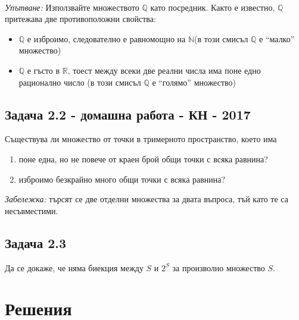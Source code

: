 \documentclass[12pt]{article}
\begin{document}
\paragraph*{}
\emph{Упътване: } Използвайте множеството $\mathbb{Q}$ като посредник. Както е известно, $\mathbb{Q}$ притежава две противоположни свойства:
\begin{itemize}
    \item $\mathbb{Q}$ е изброимо, следователно е равномощно на $\mathbb{N}$(в този смисъл $\mathbb{Q}$ е ``малко'' множество)
    \item $\mathbb{Q}$ е гъсто в $\mathbb{R}$, тоест между всеки две реални числа има поне едно рационално число (в този смисъл $\mathbb{Q}$ е ``голямо'' множество)
\end{itemize}
\subsection*{Задача 2.2 - домашна работа - КН - 2017}
Съществува ли множество от точки в тримерното пространство, което има

\begin{enumerate}[label=\Alph*)]
    \item поне една, но не повече от краен брой общи точки с всяка равнина?
    \item изброимо безкрайно много общи точки с всяка равнина?
\end{enumerate}
\emph{Забележка: } търсят се две отделни множества за двата въпроса, тъй като те са несъвместими.
\subsection*{Задача 2.3}
Да се докаже, че няма биекция между $S$ и $2^S$ за произволно множество $S$.

\section*{Решения}
\end{document}
